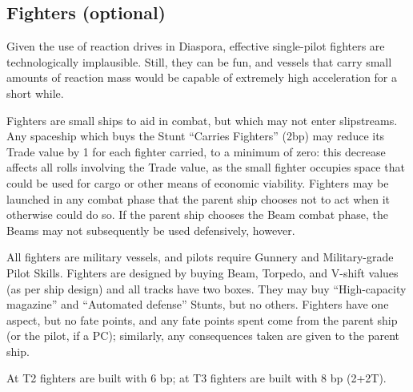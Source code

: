 \subsection{Fighters (optional)}\label{sec:spacecraft-fighters} %

Given the use of reaction drives in Diaspora, effective single-pilot fighters are technologically implausible. Still, they can be fun, and vessels that carry small amounts of reaction mass would be capable of extremely high acceleration for a short while.

Fighters are small ships to aid in combat, but which may not enter
slipstreams. Any spaceship which buys the Stunt ``Carries Fighters''
(2bp) may reduce its Trade value by 1 for each fighter carried, to a
minimum of zero: this decrease affects all rolls involving the Trade
value, as the small fighter occupies space that could be used for
cargo or other means of economic viability. Fighters may be launched
in any combat phase that the parent ship chooses not to act when it
otherwise could do so. If the parent ship chooses the Beam combat
phase, the Beams may not subsequently be used defensively, however.

All fighters are military vessels, and pilots require Gunnery and
Military-grade Pilot Skills. Fighters are designed by buying Beam,
Torpedo, and V-shift values (as per ship design) and all tracks have
two boxes. They may buy ``High-capacity magazine'' and ``Automated
defense'' Stunts, but no others. Fighters have one aspect, but no fate
points, and any fate points spent come from the parent ship (or the
pilot, if a PC); similarly, any consequences taken are given to the
parent ship.

At T2 fighters are built with 6 bp; at T3 fighters are built with 8 bp (2+2T).


